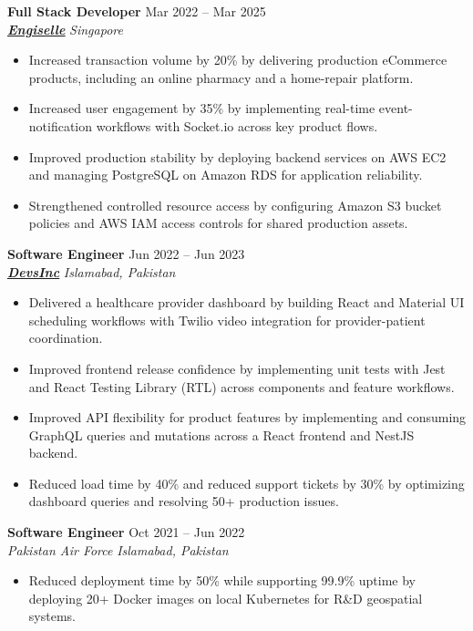 \documentclass[9pt,letterpaper]{article}
\newcommand{\role}[4]{\textbf{#1} \hfill #2 \\
\textit{#3} \hfill \textit{#4}\\[-5pt]}
\begin{document}
\role{Full Stack Developer}{Mar 2022 -- Mar 2025}{\href{https://www.engiselle.com/}{\textbf{\underline{Engiselle}}}}{Singapore}
\begin{itemize}[leftmargin=*, itemsep=0pt, topsep=0pt, partopsep=0pt, parsep=0pt, after=\vspace{1pt}]
  \item Increased transaction volume by 20\% by delivering production eCommerce products, including an online pharmacy and a home-repair platform.
  \item Increased user engagement by 35\% by implementing real-time event-notification workflows with Socket.io across key product flows.
  \item Improved production stability by deploying backend services on AWS EC2 and managing PostgreSQL on Amazon RDS for application reliability.
  \item Strengthened controlled resource access by configuring Amazon S3 bucket policies and AWS IAM access controls for shared production assets.
\end{itemize}

\role{Software Engineer}{Jun 2022 -- Jun 2023}{\href{https://www.devsinc.com/}{\textbf{\underline{DevsInc}}}}{Islamabad, Pakistan}
\begin{itemize}[leftmargin=*, itemsep=0pt, topsep=0pt, partopsep=0pt, parsep=0pt, after=\vspace{1pt}]
  \item Delivered a healthcare provider dashboard by building React and Material UI scheduling workflows with Twilio video integration for provider-patient coordination.
  \item Improved frontend release confidence by implementing unit tests with Jest and React Testing Library (RTL) across components and feature workflows.
  \item Improved API flexibility for product features by implementing and consuming GraphQL queries and mutations across a React frontend and NestJS backend.
  \item Reduced load time by 40\% and reduced support tickets by 30\% by optimizing dashboard queries and resolving 50+ production issues.
\end{itemize}

\role{Software Engineer}{Oct 2021 -- Jun 2022}{Pakistan Air Force}{Islamabad, Pakistan}
\begin{itemize}[leftmargin=*, itemsep=0pt, topsep=0pt, partopsep=0pt, parsep=0pt, after=\vspace{1pt}]
  \item Reduced deployment time by 50\% while supporting 99.9\% uptime by deploying 20+ Docker images on local Kubernetes for R\&D geospatial systems.
\end{itemize}
\end{document}
